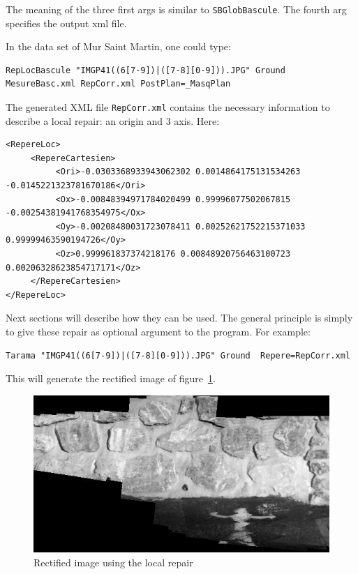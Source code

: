 The meaning of the three first args is similar to {\tt SBGlobBascule}. The fourth
arg specifies the output xml file.

In the data set of Mur Saint Martin, one could type:

\begin{verbatim}
RepLocBascule "IMGP41((6[7-9])|([7-8][0-9])).JPG" Ground MesureBasc.xml RepCorr.xml PostPlan=_MasqPlan
\end{verbatim}

The generated XML file {\tt RepCorr.xml} contains the necessary information to
describe a local repair: an origin and $3$ axis. Here:

\begin{verbatim}
<RepereLoc>
     <RepereCartesien>
          <Ori>-0.0303368933943062302 0.0014864175131534263 -0.0145221323781670186</Ori>
          <Ox>-0.00848394971784020499 0.99996077502067815 -0.00254381941768354975</Ox>
          <Oy>-0.00208480031723078411 0.00252621752215371033 0.99999463590194726</Oy>
          <Oz>0.999961837374218176 0.00848920756463100723 0.00206328623854717171</Oz>
     </RepereCartesien>
</RepereLoc>
\end{verbatim}

Next sections will describe how they can be used. The general principle is
simply to give these repair as optional argument to the program. For
example:

\begin{verbatim}
Tarama "IMGP41((6[7-9])|([7-8][0-9])).JPG" Ground  Repere=RepCorr.xml
\end{verbatim}

This will generate the rectified image of figure~\ref{FIG:OkRec:StMartin}.

\begin{figure}
\begin{center}
\includegraphics[width=120mm]{FIGS/MurSaintMartin/TA_OK-LeChantier.jpg}
\end{center}
\caption{Rectified image using the local repair}
\label{FIG:OkRec:StMartin}
\end{figure}



